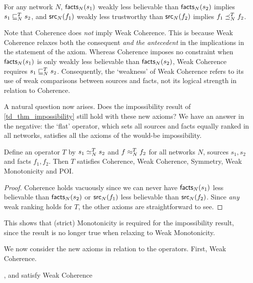 \begin{axiom}

For any network $N$, $\mathsf{facts}_N(s_1)$ weakly less believable than
$\mathsf{facts}_N(s_2)$ implies $s_1 \sqsubseteq_N^T s_2$, and $\mathsf{src}_N(f_1)$ weakly less
trustworthy than $\mathsf{src}_N(f_2)$ implies $f_1 \preceq_N^T f_2$.

\end{axiom}

Note that Coherence does \emph{not} imply Weak Coherence. This is because Weak
Coherence relaxes both the consequent \emph{and the antecedent} in the
implications in the statement of the axiom. Whereas Coherence imposes no
constraint when $\mathsf{facts}_N(s_1)$ is only weakly less believable than
$\mathsf{facts}_N(s_2)$, Weak Coherence requires $s_1 \sqsubseteq_N^T s_2$. Consequently, the
`weakness' of Weak Coherence refers to its use of weak comparisons between
sources and facts, not its logical strength in relation to Coherence.

A natural question now arises. Does the impossibility result of
\cref{td_thm_impossibility} still hold with these new axioms? We have an answer in
the negative: the `flat' operator, which sets all sources and facts equally
ranked in all networks, satisfies all the axioms of the would-be impossibility.

\begin{proposition}
    Define an operator $T$ by $s_1 \simeq_N^T s_2$ and $f \approx_N^T f_2$ for all
    networks $N$, sources $s_1, s_2$ and facts $f_1, f_2$. Then $T$ satisfies
    Coherence, Weak Coherence, Symmetry, Weak Monotonicity and POI.
\end{proposition}

\begin{proof}
    Coherence holds vacuously since we can never have $\mathsf{facts}_N(s_1)$ less
    believable than $\mathsf{facts}_N(s_2)$ or $\mathsf{src}_N(f_1)$ less believable than
    $\mathsf{src}_N(f_2)$. Since \emph{any} weak ranking holds for $T$, the other
    axioms are straightforward to see.
\end{proof}

This shows that (strict) Monotonicity is required for the impossibility result,
since the result is no longer true when relaxing to Weak Monotonicity.

We now consider the new axioms in relation to the operators. First, Weak
Coherence.

\begin{proposition}
    \label{td_prop_weak_coherence_satisfaction}
    \voting{}, \sums{} and \usums{} satisfy Weak Coherence
\end{proposition}

